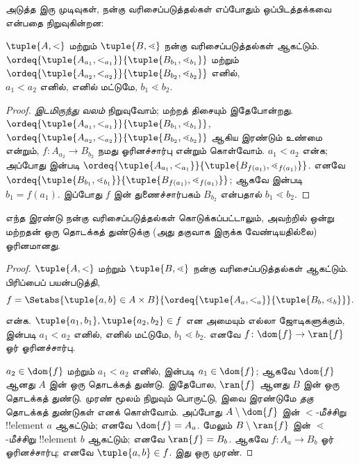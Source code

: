 \documentclass[../../../include/open-logic-section]{subfiles}
\begin{document}
அடுத்த இரு முடிவுகள், நன்கு வரிசைப்படுத்தல்கள் எப்போதும் ஒப்பிடத்தக்கவை
என்பதை நிறுவுகின்றன:

\begin{lem}
$\tuple{A, <}$ மற்றும் $\tuple{B, \lessdot}$ நன்கு வரிசைப்படுத்தல்கள்
ஆகட்டும். $\ordeq{\tuple{A_{a_1}, <_{a_1}}}{\tuple{B_{b_1},
\lessdot_{b_1}}}$ மற்றும் $\ordeq{\tuple{A_{{a_2}},
<_{a_2}}}{\tuple{B_{{b_2}}, \lessdot_{b_2}}}$ எனில், ${a_1}  <
{a_2} \text{ எனில், எனில் மட்டுமே, }{b_1} \lessdot {b_2}$.
\end{lem}

\begin{proof}
\emph{இடமிருந்து வலம்} நிறுவுவோம்; மற்றத் திசையும் இதேபோன்றது.
$\ordeq{\tuple{A_{a_1}, <_{a_1}}}{\tuple{B_{b_1},
\lessdot_{b_1}}}$, $\ordeq{\tuple{A_{{a_2}},
<_{a_2}}}{\tuple{B_{{b_2}}, \lessdot_{b_2}}}$ ஆகிய இரண்டும்
உண்மை என்றும், $f \colon A_{{a_2}} \to B_{{b_2}}$ நமது ஓரினச்சார்பு
என்றும் கொள்வோம். ${a_1} < {a_2}$ என்க; அப்போது
 இன்படி
$\ordeq{\tuple{A_{a_1}, <_{a_1}}}{\tuple{B_{f({a_1})},
\lessdot_{f({a_1})}}}$. எனவே
$\ordeq{\tuple{B_{b_1}, \lessdot_{b_1}}}{\tuple{B_{f({a_1})},
\lessdot_{f({a_1})}}}$; ஆகவே  இன்படி
${b_1} = f({a_1})$. இப்போது $f$ இன் துணைச்சார்பகம் $B_{{b_2}}$
என்பதால் ${b_1} \lessdot {b_2}$.
\end{proof}

\begin{thm}
எந்த இரண்டு நன்கு வரிசைப்படுத்தல்கள் கொடுக்கப்பட்டாலும், அவற்றில் ஒன்று
மற்றதன் ஒரு தொடக்கத் துண்டுக்கு (அது தகுவாக இருக்க வேண்டியதில்லை)
ஓரினமானது.
\end{thm}

\begin{proof}
$\tuple{A, <}$ மற்றும் $\tuple{B, \lessdot}$ நன்கு வரிசைப்படுத்தல்கள்
ஆகட்டும். பிரிப்பைப் பயன்படுத்தி,
\[
	f = \Setabs{\tuple{a, b} \in A \times B}{
		\ordeq{\tuple{A_a, <_a}}{\tuple{B_b, \lessdot_b}}}.
\]
என்க. $\tuple{a_1, b_1}, \tuple{a_2, b_2} \in f$ என அமையும் எல்லா
ஜோடிகளுக்கும்,  இன்படி $a_1 < a_2$ எனில்,
எனில் மட்டுமே, $b_1 \lessdot b_2$. எனவே $f \colon \dom{f} \to
\ran{f}$ ஓர் ஓரினச்சார்பு.

$a_2 \in \dom{f}$ மற்றும் $a_1 < a_2$ எனில்,
 இன்படி $a_1 \in \dom{f}$; ஆகவே
$\dom{f}$ ஆனது $A$ இன் ஒரு தொடக்கத் துண்டு. இதேபோல, $\ran{f}$ ஆனது
$B$ இன் ஒரு தொடக்கத் துண்டு. முரண் மூலம் நிறுவும் பொருட்டு, இவை இரண்டுமே
\emph{தகு} தொடக்கத் துண்டுகள் எனக் கொள்வோம். அப்போது $A \setminus
\dom{f}$ இன் $<$-மீச்சிறு !!{element} $a$ ஆகட்டும்; எனவே $\dom{f} =
A_a$. மேலும் $B \setminus \ran{f}$ இன் $\lessdot$-மீச்சிறு
!!{element} $b$ ஆகட்டும்; எனவே $\ran{f} = B_b$. ஆகவே $f \colon A_a
\to B_b$ ஓர் ஓரினச்சார்பு; எனவே $\tuple{a, b} \in f$. இது ஒரு முரண்.
\end{proof}
\end{document}
